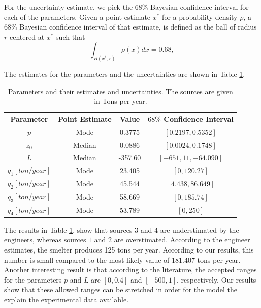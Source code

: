 \documentclass[12pt]{book}
\begin{document}
For the uncertainty estimate, we pick the $68\%$ Bayesian confidence interval
for each of the parameters. Given a point estimate $x^{*}$ 
for a probability density $\rho$, a $68\%$ Bayesian confidence interval of that estimate, 
is defined as the ball of radius $r$ centered at $x^{*}$ such that
\begin{equation*}
\int_{B(x^{*},r)}\rho(x)dx=0.68,
\end{equation*} 

The estimates for the parameters and the uncertainties are shown in Table \ref{tabFinalEstimates}.

\begin{table}[H]
\centering
\begin{tabular}{|c|c|c|c|}
\hline 
Parameter & Point Estimate & Value & $68\%$ Confidence Interval\tabularnewline
\hline 
\hline 
$p$ & Mode & 0.3775 & $[0.2197,0.5352]$\tabularnewline
\hline 
$z_{0}$ & Median & 0.0886 & $[0.0024,0.1748]$\tabularnewline
\hline 
$L$ & Median & -357.60 & $[-651,11,-64.090]$\tabularnewline
\hline 
$q_{1}[ton/year]$ & Mode & 23.405 & $[0,120.27]$\tabularnewline
\hline 
$q_{2}[ton/year]$ & Mode & 45.544 & $[4.438,86.649]$\tabularnewline
\hline 
$q_{3}[ton/year]$ & Mode & 58.669 & $[0,185.74]$\tabularnewline
\hline 
$q_{4}[ton/year]$ & Mode & 53.789 & $[0,250]$\tabularnewline
\hline 
\end{tabular}
\caption{Parameters and their estimates and uncertainties. The sources are given in Tons per year.}
\label{tabFinalEstimates}
\end{table}

The results in Table \ref{tabFinalEstimates}, show that sources $3$ and $4$ are understimated by the engineers,
whereas sources $1$ and $2$ are overstimated. According to the engineer estimates, the smelter produces
125 tons per year. According to our results, this number is small  compared to the most likely value
of 181.407 tons per year. Another interesting result is that according to the literature,
the accepted ranges for the parameters $p$ and $L$ are $[0,0.4]$ and $[-500,1]$, respectively.
Our results show that these allowed ranges can be stretched in order for the model the explain
the experimental data available. 







\end{document}
